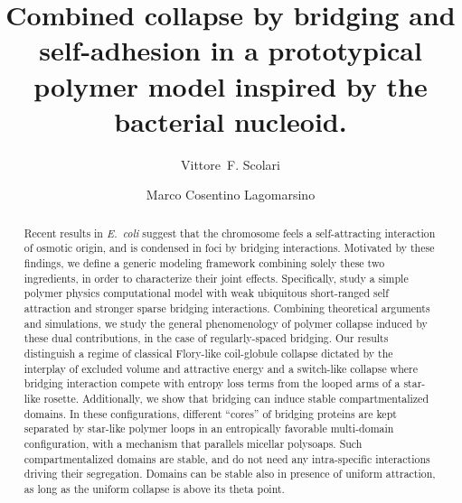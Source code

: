 \documentclass[
preprint,
a4paper,
12pt,
superscriptaddress,
pre]{revtex4}
\begin{document}
 

\title{Combined collapse by bridging and self-adhesion in a
  prototypical polymer model inspired by the bacterial nucleoid.}

\author{Vittore~F. Scolari}
%
%
%
% 
%
\author{Marco Cosentino Lagomarsino}
%

\begin{abstract}
  Recent results in \emph{E.~coli} suggest that the chromosome feels a
  self-attracting interaction of osmotic origin, and is condensed in
  foci by bridging interactions.
  Motivated by these findings, we define a generic modeling framework
  combining solely these two ingredients, in order to characterize
  their joint effects. Specifically, study a simple polymer physics
  computational model with weak ubiquitous short-ranged self
  attraction and stronger sparse bridging interactions.  Combining
  theoretical arguments and simulations, we study the general
  phenomenology of polymer collapse induced by these dual
  contributions, in the case of regularly-spaced bridging.
%
  Our results distinguish a regime of classical Flory-like
  coil-globule collapse dictated by the interplay of excluded volume
  and attractive energy and a switch-like collapse where bridging
  interaction compete with entropy loss terms from the looped arms of
  a star-like rosette.
%
  Additionally, we show that bridging can induce stable
  compartmentalized domains. In these configurations, different
  ``cores'' of bridging proteins are kept separated by star-like
  polymer loops in an entropically favorable multi-domain
  configuration, with a mechanism that parallels micellar polysoaps.
  Such compartmentalized domains are stable, and do not need any
  intra-specific interactions driving their segregation.  Domains can
  be stable also in presence of uniform attraction, as long as the
  uniform collapse is above its theta point.
\end{abstract}
\end{document}
